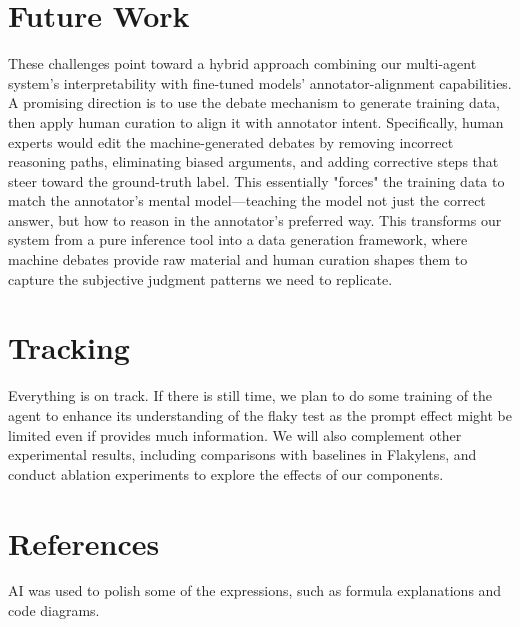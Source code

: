 \documentclass{article}
\begin{document}
\section{Future Work}
These challenges point toward a hybrid approach combining our multi-agent system's interpretability with fine-tuned models' annotator-alignment capabilities. A promising direction is to use the debate mechanism to generate training data, then apply human curation to align it with annotator intent. Specifically, human experts would edit the machine-generated debates by removing incorrect reasoning paths, eliminating biased arguments, and adding corrective steps that steer toward the ground-truth label. This essentially "forces" the training data to match the annotator's mental model—teaching the model not just the correct answer, but how to reason in the annotator's preferred way. This transforms our system from a pure inference tool into a data generation framework, where machine debates provide raw material and human curation shapes them to capture the subjective judgment patterns we need to replicate.


\section{Tracking}
Everything is on track. If there is still time, we plan to do some training of the agent to enhance its understanding of the flaky test as the prompt effect might be limited even if provides much information. We will also complement other experimental results, including comparisons with baselines in Flakylens, and conduct ablation experiments to explore the effects of our components.


\section*{References}
AI was used to polish some of the expressions, such as formula explanations and code diagrams.
\end{document}
